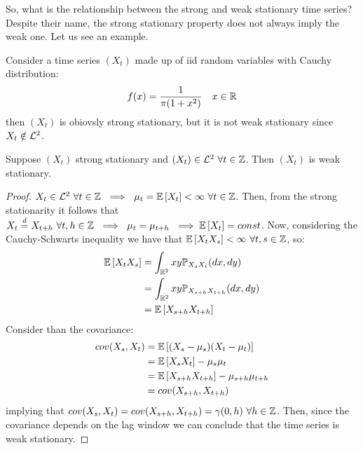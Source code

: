 So, what is the relationship between the strong and weak stationary time series? Despite their name, the strong stationary property does not always imply the weak one. Let us see an example.

\begin{example}
    Consider a time series $(X_t)$ made up of iid random variables with Cauchy distribution:
    \[
        f(x)=\frac{1}{\pi(1+x^2)}\ \ \ x\in\mathbb{R}  
    \]
    then $(X_t)$ is obiovsly strong stationary, but it is not weak stationary since $X_t\notin\mathcal{L}^{2}$.
\end{example}

\begin{theorem}
    Suppose $(X_t)$ strong stationary and $(X_t)\in\mathcal{L}^{2}\ \forall t\in\mathbb{Z}$. Then $(X_t)$ is weak stationary.
\end{theorem}

\begin{proof}
    $X_t\in\mathcal{L}^{2}\ \forall t\in\mathbb{Z}\ \implies\ \mu_t=\mathbb{E}\left[X_t\right]<\infty\ \forall t\in\mathbb{Z}$. Then, from the strong stationarity it follows that $X_t\stackrel{d}{=}X_{t+h}\ \forall t,h\in\Z\ \implies\ \mu_t=\mu_{t+h}\ \implies \expect{X_t}=const$. Now, considering the Cauchy-Schwarts inequality we have that $\mathbb{E}\left[X_tX_s\right]<\infty\ \forall t,s\in\mathbb{Z}$, so:
    \begin{equation*}
        \begin{split}
            \mathbb{E}\left[X_tX_s\right]&=\int_{\mathbb{R}^2}xy\mathbb{P}_{X_sX_t}(dx,dy)\\
            &=\int_{\mathbb{R}^2}xy\mathbb{P}_{X_{s+h}X_{t+h}}(dx,dy)\\
            &=\mathbb{E}\left[X_{s+h}X_{t+h}\right]
        \end{split}
    \end{equation*}
    Consider than the covariance:
    \begin{equation*}
        \begin{split}
            cov(X_s,X_t)&=\mathbb{E}\left[(X_s-\mu_s)(X_t-\mu_t)\right]\\
            &=\mathbb{E}\left[X_sX_t\right]-\mu_s\mu_t\\
            &=\mathbb{E}\left[X_{s+h}X_{t+h}\right]-\mu_{s+h}\mu_{t+h}\\
            &=cov(X_{s+h},X_{t+h})
        \end{split}
    \end{equation*}
    implying that $cov(X_s,X_t)=cov(X_{s+h},X_{t+h})=\gamma(0,h)\ \forall h\in\Z$. Then, since the covariance depends on the lag window we can conclude that the time series is weak stationary.
\end{proof}

